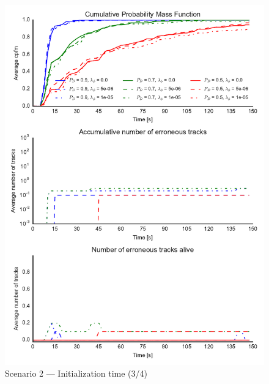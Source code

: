 \begin{figure}
\centering
\includegraphics{Figures/plots/Scenario2_Init-Time(3-4).pdf}
\caption{Scenario 2 --- Initialization time (3/4)}\label{fig:init2_time_3-4}
\end{figure}


